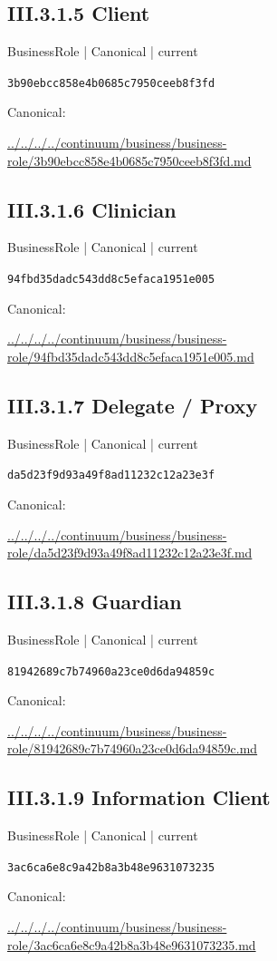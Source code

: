\documentclass[10pt,a4paper]{article}
\begin{document}
\subsection*{III.3.1.5 Client}
\label{element-3b90ebcc858e4b0685c7950ceeb8f3fd}
{\small BusinessRole | Canonical | current}\par
\texttt{3b90ebcc858e4b0685c7950ceeb8f3fd}\par
Canonical: \par
{\footnotesize\url{../../../../continuum/business/business-role/3b90ebcc858e4b0685c7950ceeb8f3fd.md}}\par
\subsection*{III.3.1.6 Clinician}
\label{element-94fbd35dadc543dd8c5efaca1951e005}
{\small BusinessRole | Canonical | current}\par
\texttt{94fbd35dadc543dd8c5efaca1951e005}\par
Canonical: \par
{\footnotesize\url{../../../../continuum/business/business-role/94fbd35dadc543dd8c5efaca1951e005.md}}\par
\subsection*{III.3.1.7 Delegate / Proxy}
\label{element-da5d23f9d93a49f8ad11232c12a23e3f}
{\small BusinessRole | Canonical | current}\par
\texttt{da5d23f9d93a49f8ad11232c12a23e3f}\par
Canonical: \par
{\footnotesize\url{../../../../continuum/business/business-role/da5d23f9d93a49f8ad11232c12a23e3f.md}}\par
\subsection*{III.3.1.8 Guardian}
\label{element-81942689c7b74960a23ce0d6da94859c}
{\small BusinessRole | Canonical | current}\par
\texttt{81942689c7b74960a23ce0d6da94859c}\par
Canonical: \par
{\footnotesize\url{../../../../continuum/business/business-role/81942689c7b74960a23ce0d6da94859c.md}}\par
\subsection*{III.3.1.9 Information Client}
\label{element-3ac6ca6e8c9a42b8a3b48e9631073235}
{\small BusinessRole | Canonical | current}\par
\texttt{3ac6ca6e8c9a42b8a3b48e9631073235}\par
Canonical: \par
{\footnotesize\url{../../../../continuum/business/business-role/3ac6ca6e8c9a42b8a3b48e9631073235.md}}\par
\end{document}
